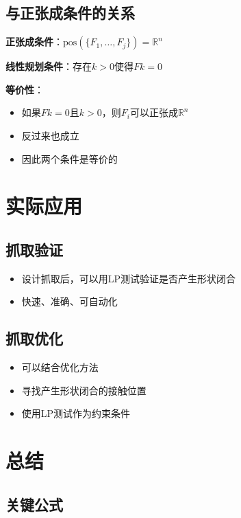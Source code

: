 \documentclass[12pt,a4paper]{article}
\begin{document}
\subsection{与正张成条件的关系}

\textbf{正张成条件}：$\text{pos}(\{F_1, \ldots, F_j\}) = \mathbb{R}^n$

\textbf{线性规划条件}：存在$k > 0$使得$F k = 0$

\textbf{等价性}：
\begin{itemize}
\item 如果$F k = 0$且$k > 0$，则$F_i$可以正张成$\mathbb{R}^n$
\item 反过来也成立
\item 因此两个条件是等价的
\end{itemize}

\section{实际应用}

\subsection{抓取验证}

\begin{itemize}
\item 设计抓取后，可以用LP测试验证是否产生形状闭合
\item 快速、准确、可自动化
\end{itemize}

\subsection{抓取优化}

\begin{itemize}
\item 可以结合优化方法
\item 寻找产生形状闭合的接触位置
\item 使用LP测试作为约束条件
\end{itemize}

\section{总结}

\subsection{关键公式}
\end{document}

